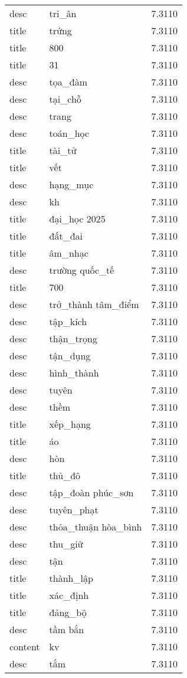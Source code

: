 \documentclass{article}
\begin{document}
\begin{tabular}{lll}
desc & tri\_ân & 7.3110\\
title & trứng & 7.3110\\
title & 800 & 7.3110\\
title & 31 & 7.3110\\
desc & tọa\_đàm & 7.3110\\
desc & tại\_chỗ & 7.3110\\
desc & trang & 7.3110\\
desc & toán\_học & 7.3110\\
title & tài\_tử & 7.3110\\
title & vết & 7.3110\\
desc & hạng\_mục & 7.3110\\
desc & kh & 7.3110\\
title & đại\_học 2025 & 7.3110\\
title & đất\_đai & 7.3110\\
title & âm\_nhạc & 7.3110\\
desc & trường quốc\_tế & 7.3110\\
title & 700 & 7.3110\\
desc & trở\_thành tâm\_điểm & 7.3110\\
desc & tập\_kích & 7.3110\\
desc & thận\_trọng & 7.3110\\
desc & tận\_dụng & 7.3110\\
desc & hình\_thành & 7.3110\\
desc & tuyên & 7.3110\\
desc & thềm & 7.3110\\
title & xếp\_hạng & 7.3110\\
title & áo & 7.3110\\
desc & hòn & 7.3110\\
title & thủ\_đô & 7.3110\\
desc & tập\_đoàn phúc\_sơn & 7.3110\\
desc & tuyên\_phạt & 7.3110\\
desc & thỏa\_thuận hòa\_bình & 7.3110\\
desc & thu\_giữ & 7.3110\\
desc & tận & 7.3110\\
title & thành\_lập & 7.3110\\
title & xác\_định & 7.3110\\
title & đảng\_bộ & 7.3110\\
desc & tầm bắn & 7.3110\\
content & kv & 7.3110\\
desc & tắm & 7.3110\\

\end{tabular}
\end{document}
